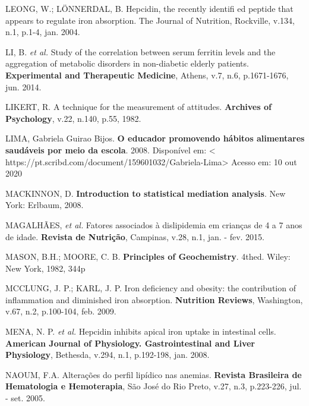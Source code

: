 \bigbreak

\noindent LEONG, W.; LÖNNERDAL, B. Hepcidin, the recently identifi ed peptide that appears to regulate iron absorption. The Journal of Nutrition, Rockville, v.134, n.1, p.1-4, jan. 2004.

\bigbreak

\noindent LI, B. \textit{et al.} Study of the correlation between serum ferritin levels and the aggregation of metabolic disorders in non-diabetic elderly patients. \textbf{Experimental and Therapeutic Medicine}, Athens, v.7, n.6, p.1671-1676, jun. 2014.

\bigbreak

\noindent LIKERT, R. A technique for the measurement of attitudes. \textbf{Archives of Psychology}, v.22, n.140, p.55, 1982. 

\bigbreak

\noindent LIMA, Gabriela Guirao Bijos. \textbf{O educador promovendo hábitos alimentares saudáveis por meio da escola}. 2008. Disponível em: < https://pt.scribd.com/document/159601032/Gabriela-Lima> Acesso em: 10 out 2020

\bigbreak

\noindent MACKINNON, D. \textbf{Introduction to statistical mediation analysis}. New York: Erlbaum, 2008.

\bigbreak

\noindent MAGALHÃES, \textit{et al.} Fatores associados à dislipidemia em crianças de 4 a 7 anos de idade. \textbf{Revista de Nutrição}, Campinas, v.28, n.1, jan. - fev. 2015.

\bigbreak

\noindent MASON, B.H.; MOORE, C. B. \textbf{Principles of Geochemistry}. 4thed. Wiley: New York, 1982, 344p 

\bigbreak

\noindent MCCLUNG, J. P.; KARL, J. P. Iron deficiency and obesity: the contribution of inflammation and diminished iron absorption. \textbf{Nutrition Reviews}, Washington, v.67, n.2, p.100-104, feb. 2009.

\bigbreak

\noindent MENA, N. P. \textit{et al.} Hepcidin inhibits apical iron uptake in intestinal cells. \textbf{American Journal of Physiology. Gastrointestinal and Liver Physiology}, Bethesda, v.294, n.1, p.192-198, jan. 2008. 

\bigbreak

\noindent NAOUM, F.A. Alterações do perfil lipídico nas anemias. \textbf{Revista Brasileira de Hematologia e Hemoterapia}, São José do Rio Preto, v.27, n.3, p.223-226, jul. - set. 2005.

